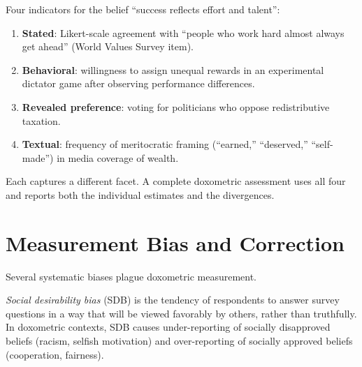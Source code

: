 \begin{example}
\label{ex:measuring-meritocracy}
Four indicators for the belief ``success reflects effort and talent'':
\begin{enumerate}[nosep]
  \item \textbf{Stated}: Likert-scale agreement with ``people who work hard almost always get ahead'' (World Values Survey item).
  \item \textbf{Behavioral}: willingness to assign unequal rewards in an experimental dictator game after observing performance differences.
  \item \textbf{Revealed preference}: voting for politicians who oppose redistributive taxation.
  \item \textbf{Textual}: frequency of meritocratic framing (``earned,'' ``deserved,'' ``self-made'') in media coverage of wealth.
\end{enumerate}
Each captures a different facet.
A complete doxometric assessment uses all four and reports both the individual estimates and the divergences.
\end{example}


\section{Measurement Bias and Correction}
\label{sec:ch13-bias}

Several systematic biases plague doxometric measurement.

\begin{definition}
\label{def:social-desirability}
\emph{Social desirability bias} (SDB) is the tendency of respondents to answer survey questions in a way that will be viewed favorably by others, rather than truthfully.
In doxometric contexts, SDB causes under-reporting of socially disapproved beliefs (racism, selfish motivation) and over-reporting of socially approved beliefs (cooperation, fairness).
\end{definition}

